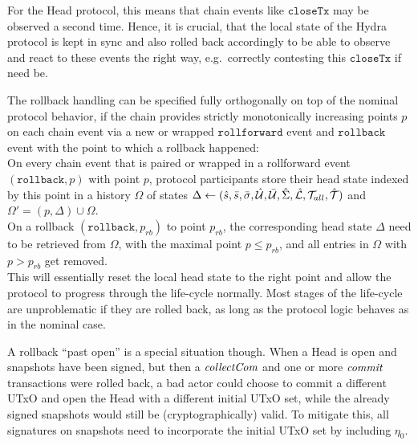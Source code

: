 For the Head protocol, this means that chain events like $\mathtt{closeTx}$ may
be observed a second time. Hence, it is crucial, that the local state of the
Hydra protocol is kept in sync and also rolled back accordingly to be able to
observe and react to these events the right way, e.g.\ correctly contesting this
$\mathtt{closeTx}$ if need be.

The rollback handling can be specified fully orthogonally on top of the nominal
protocol behavior, if the chain provides strictly monotonically increasing
points $p$ on each chain event via a new or wrapped $\mathtt{rollforward}$
event and $\mathtt{rollback}$ event with the point to which a rollback happened:\\

\quad On every chain event that is paired or
wrapped in a rollforward event $(\mathtt{rollback},p)$ with point $p$, protocol
participants store their head state indexed by this point in a history
$\Omega$ of states
$\Delta \gets (\hat s, \bar s, \bar{\sigma}, \hat {\mathcal U}, \bar {\mathcal U}, \hat{\Sigma}, \hat {\mathcal L}, {\mathcal T}_{all}, \hat {\mathcal T})$ and $\Omega' = (p, \Delta) \cup \Omega$. \\

\quad On a rollback
$(\mathtt{rollback},p_{rb})$ to point $p_{rb}$, the corresponding head state
$\Delta$ need to be retrieved from $\Omega$, with the maximal point
$p \leq p_{rb}$, and all entries in $\Omega$ with $p > p_{rb}$ get removed. \\

This will essentially reset the local head state to the right point and allow
the protocol to progress through the life-cycle normally. Most stages of the
life-cycle are unproblematic if they are rolled back, as long as the protocol
logic behaves as in the nominal case.

A rollback ``past open'' is a special situation though. When a Head is open and
snapshots have been signed, but then a $\textit{collectCom}$ and one or more
$\textit{commit}$ transactions were rolled back, a bad actor could choose to commit a
different UTxO and open the Head with a different initial UTxO set, while the
already signed snapshots would still be (cryptographically) valid. To mitigate
this, all signatures on snapshots need to incorporate the initial UTxO set by
including $\eta_{0}$.




